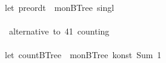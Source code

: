 \documentclass[a4paper]{article}
\begin{document}
\begin{tabbing}
\ttfamily ~\\
\ttfamily ~let~preordt~~monBTree~singl\\
\ttfamily ~\\
\ttfamily ~~alternative~to~41~counting~\\
\ttfamily ~\\
\ttfamily ~let~countBTree~~monBTree~konst~Sum~1
\end{tabbing}



\printindex





\end{document}
